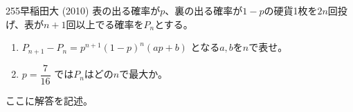 \begin{thm}{255}{}{早稲田大 (2010)}
 表の出る確率が$p$、裏の出る確率が$1-p$の硬貨1枚を$2n$回投げ、表が$n+1$回以上でる確率を$P_n$とする。
 \begin{enumerate}
  \item $P_{n+1}-P_n=p^{n+1}(1-p)^n(ap+b)$ となる$a,b$を$n$で表せ。
  \item $p=\dfrac{7}{16}$ では$P_n$はどの$n$で最大か。
 \end{enumerate}
\end{thm}

ここに解答を記述。